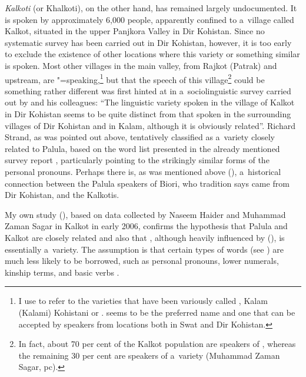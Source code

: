\textit{Kalkoti} (or Khalkoti), on the other hand, has remained largely undocumented. It is spoken by approximately 6,000 people, apparently confined to a~village called Kalkot, situated in the upper Panjkora Valley in Dir Kohistan. Since no systematic survey has been carried out in Dir Kohistan, however, it is too early to exclude the existence of other locations where this variety or something similar is spoken. Most other villages in the main valley, from Rajkot (Patrak) and upstream, are \iliGawri"=speaking,\footnote{I use \iliGawri to refer to the \iliKohistani varieties that have been variously called \iliBashkarik, Kalam (Kalami) Kohistani or \iliDirKohistani. \iliGawri seems to be the preferred name and one that can be accepted by speakers from locations both in Swat and Dir Kohistan.} but that the speech of this village\footnote{In fact, 
  about 70 per cent of the Kalkot population are speakers of \iliKalkoti, whereas the remaining 30 per cent are speakers of a~\iliGawri variety (Muhammad Zaman Sagar, pc).} could be something rather different was first hinted at in a~sociolinguistic survey carried out by \citet[7]{rensch1992} and his colleagues: ``The linguistic variety spoken in the village of Kalkot in Dir Kohistan seems to be quite distinct from that spoken in the surrounding villages of Dir Kohistan and in Kalam, although it is obviously related''. Richard Strand, as was pointed out above, tentatively classified \iliKalkoti as a~\iliShina variety closely related to Palula, based on the word list presented in the already mentioned survey report \citep[159--176]{rensch1992}, particularly pointing to the strikingly similar forms of the personal pronouns. Perhaps there is, as was mentioned above (), a~historical connection between the Palula speakers of Biori, who tradition says came from Dir Kohistan, and the Kalkotis.


My own study (\citealt{liljegren2013}), based on data collected by Naseem Haider and Muhammad Zaman Sagar in Kalkot in early 2006, confirms the hypothesis that Palula and Kalkot are closely related and also that \iliKalkoti, although heavily influenced by \iliKohistani (\iliGawri), is essentially a~\iliShina variety. The assumption is that certain types of words (see ) are much less likely to be borrowed, such as personal pronouns, lower numerals, kinship terms, and basic verbs \citep[23]{trask1996}.



